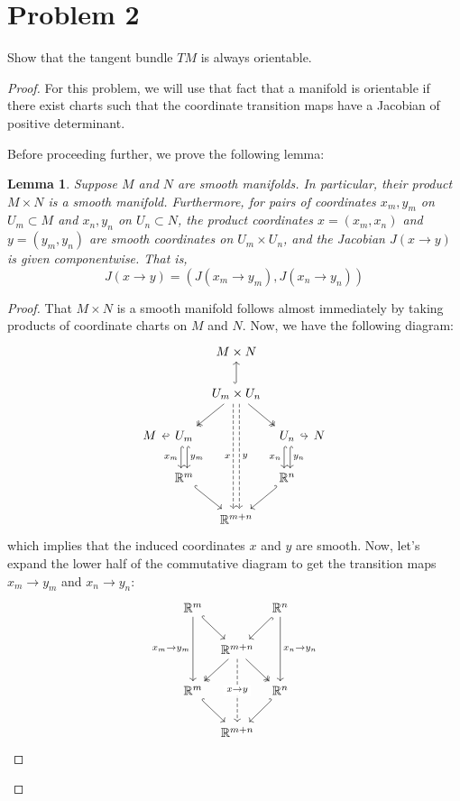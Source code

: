 \documentclass[fontsize=11pt]{scrartcl} %
\numberwithin{equation}{section} %
\numberwithin{figure}{section} %
\numberwithin{table}{section} %
\newcommand{\R}{\mathbb{R}}
\newtheorem*{lemma}{Lemma}
\begin{document}
\section*{Problem 2}
Show that the tangent bundle $TM$ is always orientable.
\\
\begin{proof}
For this problem, we will use that fact that a manifold is orientable if there exist
charts such that the coordinate transition maps have a Jacobian of positive determinant.

Before proceeding further, we prove the following lemma:

\begin{lemma}
Suppose $M$ and $N$ are smooth manifolds. In particular, their product $M\times N$ is a
smooth manifold. Furthermore, for pairs of coordinates $x_m,y_m$ on $U_m\subset M$ and
$x_n,y_n$ on $U_n\subset N$, the product coordinates $x=(x_m,x_n)$ and $y=(y_m,y_n)$ are
smooth coordinates on $U_m\times U_n$, and the Jacobian $J(x\to y)$ is given componentwise.
That is,
\[
J(x\to y) = (J(x_m\to y_m),J(x_n\to y_n))
\]
\end{lemma}
\begin{proof}
That $M\times N$ is a smooth manifold follows almost immediately by taking products of
coordinate charts on $M$ and $N$. Now, we have the following diagram:
\[
\begin{tikzcd}[column sep=tiny]
 &                  &M\times N                  &       &\\
 &                  &U_m\times U_n\arrow[hook]{u}\arrow[dashed, shift right]{ddd}[swap]{x}\arrow[dashed, shift left]{ddd}{y}\arrow[two heads]{dl}\arrow[two heads]{dr}&     &\\
M& U_m\arrow[hook']{l}\arrow[hook, shift right]{d}[swap]{x_m} \arrow[hook, shift left]{d}{y_m} && U_n\arrow[hook]{r} \arrow[hook, shift right]{d}[swap]{x_n}\arrow[hook,shift left]{d}{y_n} &N\\
 & \R^m\arrow[hook]{dr} &&\R^n\arrow[hook']{dl} &\\
    &&\R^{m+n} &&
\end{tikzcd}
\]
which implies that the induced coordinates $x$ and $y$ are smooth.
Now, let's expand the lower half of the commutative diagram to get the transition maps
$x_m\to y_m$ and $x_n\to y_n$:
\[
\begin{tikzcd}[column sep=tiny]
\R^m\arrow{dd}[swap]{x_m\to y_m}\arrow[hook]{dr} &&\R^n\arrow{dd}{x_n\to y_n}\arrow[hook]{dl}\\ 
&\R^{m+n}\arrow[dashed]{dd}[description]{x\to y}\arrow[two heads]{dl}\arrow[two heads]{dr}&\\
\R^m\arrow[hook]{dr}&&\R^n\arrow[hook']{dl}\\
&\R^{m+n}
\end{tikzcd}
\]


\end{proof}
\end{proof}
\end{document}
